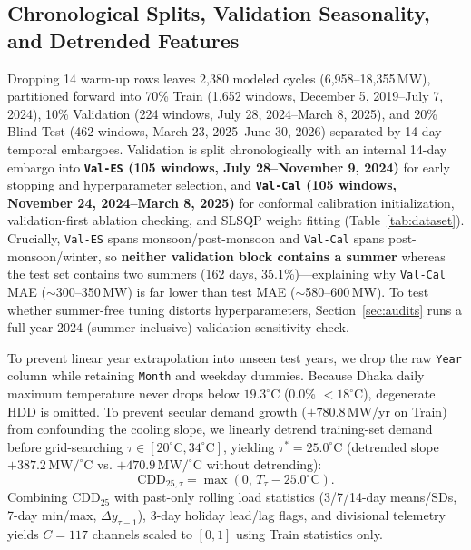 \documentclass[5p,twocolumn,authoryear]{elsarticle}
\begin{document}
\subsection{Chronological Splits, Validation Seasonality, and Detrended Features}
Dropping 14 warm-up rows leaves 2,380 modeled cycles (6,958--18,355\,MW), partitioned forward into 70\% Train (1,652 windows, December 5, 2019--July 7, 2024), 10\% Validation (224 windows, July 28, 2024--March 8, 2025), and 20\% Blind Test (462 windows, March 23, 2025--June 30, 2026) separated by 14-day temporal embargoes. Validation is split chronologically with an internal 14-day embargo into \textbf{\texttt{Val-ES} (105 windows, July 28--November 9, 2024)} for early stopping and hyperparameter selection, and \textbf{\texttt{Val-Cal} (105 windows, November 24, 2024--March 8, 2025)} for conformal calibration initialization, validation-first ablation checking, and SLSQP weight fitting (Table~\ref{tab:dataset}). Crucially, \texttt{Val-ES} spans monsoon/post-monsoon and \texttt{Val-Cal} spans post-monsoon/winter, so \textbf{neither validation block contains a summer} whereas the test set contains two summers (162 days, 35.1\%)---explaining why \texttt{Val-Cal} MAE ($\sim$300--350\,MW) is far lower than test MAE ($\sim$580--600\,MW). To test whether summer-free tuning distorts hyperparameters, Section~\ref{sec:audits} runs a full-year 2024 (summer-inclusive) validation sensitivity check.

To prevent linear year extrapolation into unseen test years, we drop the raw \texttt{Year} column while retaining \texttt{Month} and weekday dummies. Because Dhaka daily maximum temperature never drops below $19.3^\circ\text{C}$ (0.0\% $< 18^\circ\text{C}$), degenerate HDD is omitted. To prevent secular demand growth ($+780.8$\,MW/yr on Train) from confounding the cooling slope, we linearly detrend training-set demand before grid-searching $\tau \in [20^\circ\text{C}, 34^\circ\text{C}]$, yielding $\tau^* = 25.0^\circ\text{C}$ (detrended slope $+387.2\,\text{MW}/^\circ\text{C}$ vs. $+470.9\,\text{MW}/^\circ\text{C}$ without detrending):
\begin{equation}
    \text{CDD}_{25,\tau} = \max\!\left(0,\, T_\tau - 25.0^\circ\text{C}\right).
\end{equation}
Combining $\text{CDD}_{25}$ with past-only rolling load statistics (3/7/14-day means/SDs, 7-day min/max, $\Delta y_{\tau-1}$), 3-day holiday lead/lag flags, and divisional telemetry yields $C = 117$ channels scaled to $[0, 1]$ using Train statistics only.
\end{document}
